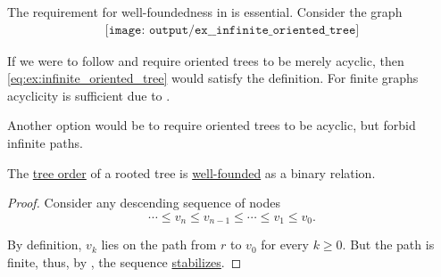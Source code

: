\begin{example}\label{ex:infinite_oriented_tree}
  The requirement for well-foundedness in  is essential. Consider the graph
  \begin{equation}\label{eq:ex:infinite_oriented_tree}
    \begin{aligned}
      \texttt{[image: output/ex\_\_infinite\_oriented\_tree]}
    \end{aligned}
  \end{equation}

  If we were to follow  and require oriented trees to be merely acyclic, then \eqref{eq:ex:infinite_oriented_tree} would satisfy the definition. For finite graphs acyclicity is sufficient due to .

  Another option would be to require oriented trees to be acyclic, but forbid infinite paths.
\end{example}

\begin{lemma}\label{thm:tree_order_well_founded}
  The \hyperref[def:tree/order]{tree order} of a rooted tree is \hyperref[def:well_founded_relation]{well-founded} as a binary relation.
\end{lemma}
\begin{proof}
  Consider any descending sequence of nodes
  \begin{equation*}
    \cdots \leq v_n \leq v_{n-1} \leq \cdots \leq v_1 \leq v_0.
  \end{equation*}

  By definition, \( v_k \) lies on the path from \( r \) to \( v_0 \) for every \( k \geq 0 \). But the path is finite, thus, by , the sequence \hyperref[def:stabilizing_sequence]{stabilizes}.
\end{proof}


